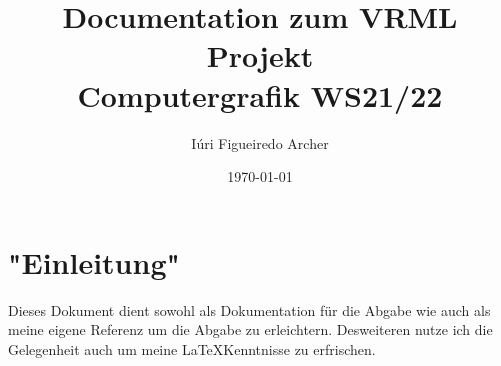 \documentclass{article}
\author{Iúri Figueiredo Archer}
\date{\today}
\title{Documentation zum VRML Projekt\\\large{Computergrafik WS21/22}}
\begin{document}
\maketitle

\section{"Einleitung"}
Dieses Dokument dient sowohl als Dokumentation für die Abgabe wie auch
als meine eigene Referenz um die Abgabe zu erleichtern. Desweiteren
nutze ich die Gelegenheit auch um meine \LaTeX Kenntnisse zu
erfrischen.

\index
\end{document}
